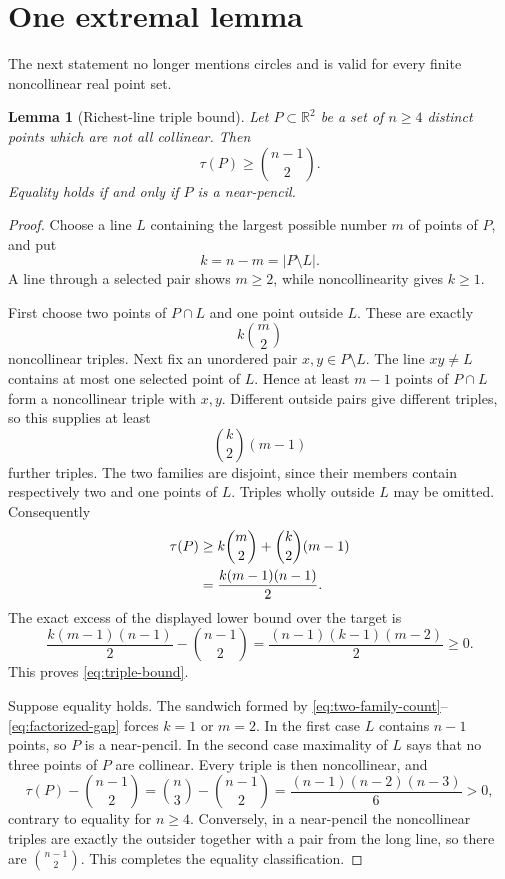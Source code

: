 \documentclass[11pt]{article}
\newtheorem{lemma}[theorem]{Lemma}
\theoremstyle{definition}
\theoremstyle{remark}
\newcommand{\R}{\mathbb R}
\begin{document}
\section{One extremal lemma}

The next statement no longer mentions circles and is valid for every
finite noncollinear real point set.

\begin{lemma}[Richest-line triple bound]\label{lem:triple-bound}
Let \(P\subset\R^2\) be a set of \(n\ge4\) distinct points which are not all
collinear.  Then
\begin{equation}\label{eq:triple-bound}
 \tau(P)\ge\binom{n-1}{2}.
\end{equation}
Equality holds if and only if \(P\) is a near-pencil.
\end{lemma}

\begin{proof}
Choose a line \(L\) containing the largest possible number \(m\) of points
of \(P\), and put
\[
 k=n-m=|P\setminus L|.
\]
A line through a selected pair shows \(m\ge2\), while noncollinearity gives
\(k\ge1\).

First choose two points of \(P\cap L\) and one point outside \(L\).  These
are exactly
\[
 k\binom m2
\]
noncollinear triples.  Next fix an unordered pair \(x,y\in P\setminus L\).
The line \(xy\ne L\) contains at most one selected point of \(L\).  Hence at
least \(m-1\) points of \(P\cap L\) form a noncollinear triple with
\(x,y\).  Different outside pairs give different triples, so this supplies
at least
\[
 \binom k2(m-1)
\]
further triples.  The two families are disjoint, since their members contain
respectively two and one points of \(L\).  Triples wholly outside \(L\) may
be omitted.  Consequently
\begin{align}
 \tau(P)
 &\ge k\binom m2+\binom k2(m-1)\notag\\
 &=\frac{k(m-1)(n-1)}2.\label{eq:two-family-count}
\end{align}
The exact excess of the displayed lower bound over the target is
\begin{equation}\label{eq:factorized-gap}
 \frac{k(m-1)(n-1)}2-\binom{n-1}{2}
 =\frac{(n-1)(k-1)(m-2)}2\ge0.
\end{equation}
This proves \eqref{eq:triple-bound}.

Suppose equality holds.  The sandwich formed by
\eqref{eq:two-family-count}--\eqref{eq:factorized-gap} forces
\(k=1\) or \(m=2\).  In the first case \(L\) contains \(n-1\) points, so
\(P\) is a near-pencil.  In the second case maximality of \(L\) says that no
three points of \(P\) are collinear.  Every triple is then noncollinear, and
\[
 \tau(P)-\binom{n-1}{2}
 =\binom n3-\binom{n-1}{2}
 =\frac{(n-1)(n-2)(n-3)}6>0,
\]
contrary to equality for \(n\ge4\).  Conversely, in a near-pencil the
noncollinear triples are exactly the outsider together with a pair from
the long line, so there are \(\binom{n-1}{2}\).  This completes the equality
classification.
\end{proof}
\end{document}

